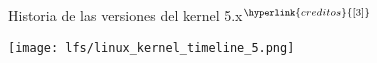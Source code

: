 \begin{frame}[c]{Historia de las versiones del kernel 5.x$^{\hyperlink{creditos}{[3]}}$}
  \begin{center}
    \texttt{[image: lfs/linux\_kernel\_timeline\_5.png]}
  \end{center}
\end{frame}


%
%
